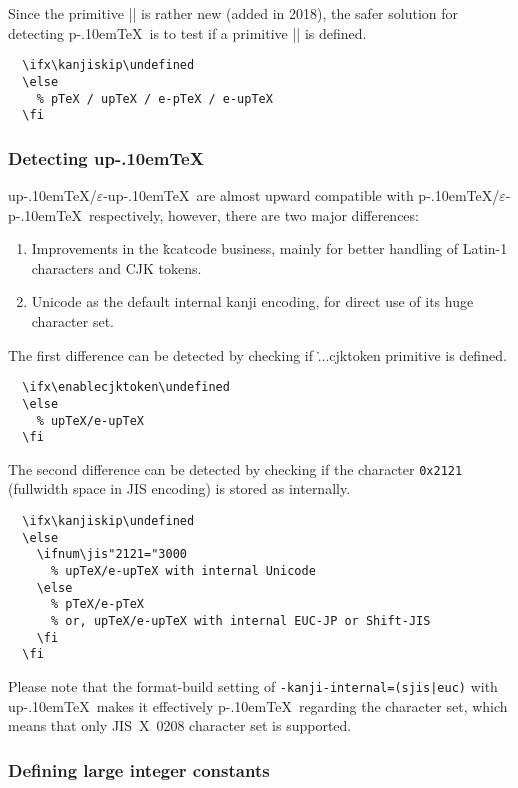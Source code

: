 \documentclass[a4paper,11pt]{article}
\def\code#1{\texttt{#1}}
\def\epTeX{$\varepsilon$-\pTeX}\def\eTeX{$\varepsilon$-\TeX}
\def\eupTeX{$\varepsilon$-\upTeX}\def\upTeX{u\pTeX}
\def\pTeX{p\kern-.10em\TeX}
\begin{document}
Since the primitive |\ptexversion| is rather new (added in 2018),
the safer solution for detecting \pTeX\ is
to test if a primitive |\kanjiskip| is defined.
\begin{verbatim}
  \ifx\kanjiskip\undefined
  \else
    % pTeX / upTeX / e-pTeX / e-upTeX
  \fi
\end{verbatim}

\subsubsection{Detecting \upTeX}

\upTeX/\eupTeX\ are almost upward compatible
with \pTeX/\epTeX\ respectively, however,
there are two major differences:
\begin{enumerate}
  \item Improvements in the \.{kcatcode} business,
    mainly for better handling of Latin-1 characters and CJK tokens.
  \item Unicode as the default internal kanji encoding,
    for direct use of its huge character set.
\end{enumerate}

The first difference can be detected by checking if
\.{...cjktoken} primitive is defined.
\begin{verbatim}
  \ifx\enablecjktoken\undefined
  \else
    % upTeX/e-upTeX
  \fi
\end{verbatim}

The second difference can be detected by checking if
the character \code{0x2121} (fullwidth space in JIS encoding)
is stored as  internally.
\begin{verbatim}
  \ifx\kanjiskip\undefined
  \else
    \ifnum\jis"2121="3000
      % upTeX/e-upTeX with internal Unicode
    \else
      % pTeX/e-pTeX
      % or, upTeX/e-upTeX with internal EUC-JP or Shift-JIS
    \fi
  \fi
\end{verbatim}
Please note that
the format-build setting of \verb+-kanji-internal=(sjis|euc)+ with
\upTeX\ makes it effectively \pTeX\ regarding the character set,
which means that only JIS~X~0208 character set is supported.


\subsubsection{Defining large integer constants}
\label{chardef}
\end{document}
